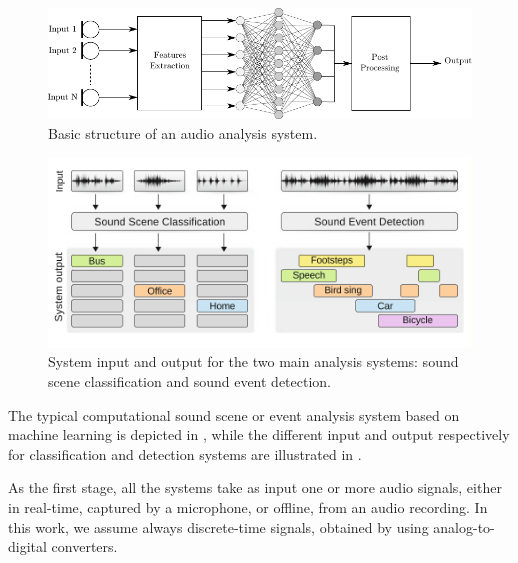 \begin{figure}[b]
	\centering
	\includegraphics[width=\linewidth]{img/flowchart_1.pdf}
	\caption[Basic structure]{Basic structure of an audio analysis system.}
	\label{fig:base-system}
\end{figure}

\begin{figure}[tb]
	\centering
	\includegraphics[width=\linewidth]{img/sed_sec.pdf}
	\caption[System input and output ]{System input and output for the two main analysis systems: sound scene classification and sound event detection.}
	\label{fig:system-io}
\end{figure}

The typical computational sound scene
or event analysis system based on machine learning is
depicted in , while the different input and output respectively for classification and detection systems
are illustrated in .

As the first stage, all the systems take as input one or more audio
signals, either in real-time, captured by a microphone, or offline, from an
audio recording. In this work, we assume always discrete-time signals,
obtained by using analog-to-digital converters. 

